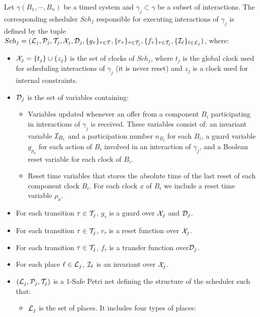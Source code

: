 \begin{definition}[Scheduler]\label{def:sch_sr}
  Let $\gamma(B_1,\cdots,B_n)$ be a timed system and $\gamma_j\subset\gamma$ be a subset of
  interactions. The corresponding scheduler $Sch_j$ responsible for executing interactions
  of $\gamma_j$ is defined by the tuple  
  $Sch_j=(\mathcal{L}_j, \mathcal{P}_j,\mathcal{T}_j,\mathcal{X}_j, \mathcal{D}_j,\{g_{\tau}\}_{\tau\in\mathcal{T}},
  \{r_{\tau}\}_{\tau\in\mathcal{T}_j},\{f_{\tau}\}_{\tau\in\mathcal{T}_j},\{\mathcal{I}_{\ell}\}_{\ell\in\mathcal{L}_j})
  $, where:
  \begin{itemize}
    \item $\mathcal{X}_j=\{t_j\}\cup\{z_j\}$ is the set of clocks of $Sch_j$, where $t_j$ is
      the global clock used for scheduling interactions of $\gamma_j$ (it is never reset)
      and $z_j$ is a clock used for internal constraints. 
    \item $\mathcal{D}_j$ is the set of variables containing:
      \begin{itemize}
        \item Variables updated whenever an offer from a component $B_i$ participating in 
          interactions of $\gamma_j$ is received. These variables consist of: an invariant
          variable $\mathcal{I}_{B_i}$ and a participation number $n_{B_i}$ for each $B_i$, 
          a guard variable $g_{p_a}$ for each action of $B_i$ involved in an interaction of 
          $\gamma_j$, and a Boolean reset variable for each clock of $B_i$.
        \item Reset time variables that stores the absolute time of the last reset of 
          each component clock $B_i$. For each clock $x$ of $B_i$ we include a reset time 
          variable $\rho_x$.
      \end{itemize}
    \item For each transition $\tau\in\mathcal{T}_j$, $g_{\tau}$ is a guard over 
      $\mathcal{X}_j$ and $\mathcal{D}_j$.
    \item For each transition $\tau\in\mathcal{T}_j$, $r_{\tau}$ is a reset function over $\mathcal{X}_j$.
    \item For each transition $\tau\in\mathcal{T}_j$, $f_{\tau}$ is a transfer function over$\mathcal{D}_j$.
    \item For each place $\ell\in\mathcal{L}_j$, $\mathcal{I}_{\ell}$ is an invariant over $\mathcal{X}_j$. 
    \item $(\mathcal{L}_j,\mathcal{P}_j,\mathcal{T}_j)$ is a 1-Safe Petri net defining 
      the structure of the scheduler such that:
      \begin{itemize}
        \item $\mathcal{L}_j$ is the set of places. It includes four types of places:

\end{itemize}
\end{itemize}
\end{definition}
